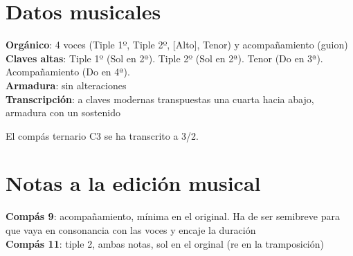 
\section*{\centering\Large{Datos musicales}}
\noindent \textbf{Orgánico}: 4 voces (Tiple 1º, Tiple 2º, [Alto], Tenor) y acompañamiento (guion)\\
\textbf{Claves altas}: Tiple 1º (Sol en 2ª). Tiple 2º (Sol en 2ª). Tenor (Do en 3ª). Acompañamiento (Do en 4ª).\\
\textbf{Armadura}: sin alteraciones\\
\textbf{Transcripción}: a claves modernas transpuestas una cuarta hacia abajo, armadura con un sostenido


\noindent El compás ternario C3 se ha transcrito a 3/2.

\section*{\centering\Large{Notas a la edición musical}}
\noindent \textbf{Compás 9}: acompañamiento, mínima en el original. Ha de ser semibreve para que vaya en consonancia con las voces y encaje la duración\\
\textbf{Compás 11}: tiple 2, ambas notas, sol en el orginal (re en la tramposición)


